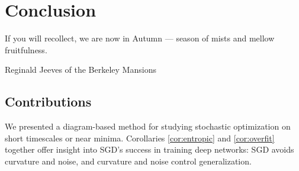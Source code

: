 \documentclass[openany, notitlepage, justified]{tufte-book}
\theoremstyle{plain}
\theoremstyle{definition}
\begin{document}

\chapter{Conclusion} \label{sect:concl}


    \renewcommand{\textflush}{flushright}
    \setlength{\epigraphwidth}{0.49\columnwidth}
    \epigraph{
        If you will recollect, we are now in Autumn ---
        season of mists and mellow fruitfulness.
    }{Reginald Jeeves of the Berkeley Mansions}



    \section{Contributions}


    We presented a diagram-based method for studying stochastic optimization on
    short timescales or near minima.
        Corollaries \ref{cor:entropic} and \ref{cor:overfit} together offer
        insight into SGD's success in training deep networks: SGD avoids
        curvature and noise, and curvature and noise control generalization.
\end{document}
